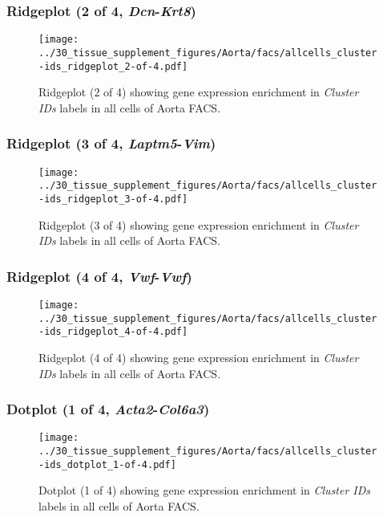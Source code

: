 \clearpage

\subsubsection{Ridgeplot (2 of 4, \emph{Dcn}-\emph{Krt8})}
\begin{figure}[h]
\centering
\texttt{[image: ../30\_tissue\_supplement\_figures/Aorta/facs/allcells\_cluster-ids\_ridgeplot\_2-of-4.pdf]}

\caption{ Ridgeplot (2 of 4)  showing gene expression enrichment in \emph{Cluster IDs} labels in all cells of Aorta FACS. }
\end{figure}


\clearpage

\subsubsection{Ridgeplot (3 of 4, \emph{Laptm5}-\emph{Vim})}
\begin{figure}[h]
\centering
\texttt{[image: ../30\_tissue\_supplement\_figures/Aorta/facs/allcells\_cluster-ids\_ridgeplot\_3-of-4.pdf]}

\caption{ Ridgeplot (3 of 4)  showing gene expression enrichment in \emph{Cluster IDs} labels in all cells of Aorta FACS. }
\end{figure}


\clearpage

\subsubsection{Ridgeplot (4 of 4, \emph{Vwf}-\emph{Vwf})}
\begin{figure}[h]
\centering
\texttt{[image: ../30\_tissue\_supplement\_figures/Aorta/facs/allcells\_cluster-ids\_ridgeplot\_4-of-4.pdf]}

\caption{ Ridgeplot (4 of 4)  showing gene expression enrichment in \emph{Cluster IDs} labels in all cells of Aorta FACS. }
\end{figure}


\clearpage

\subsubsection{Dotplot (1 of 4, \emph{Acta2}-\emph{Col6a3})}
\begin{figure}[h]
\centering
\texttt{[image: ../30\_tissue\_supplement\_figures/Aorta/facs/allcells\_cluster-ids\_dotplot\_1-of-4.pdf]}

\caption{ Dotplot (1 of 4)  showing gene expression enrichment in \emph{Cluster IDs} labels in all cells of Aorta FACS. }
\end{figure}


